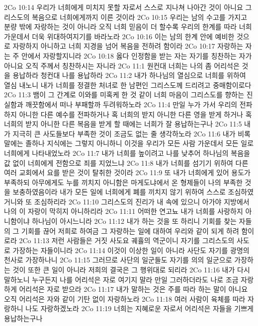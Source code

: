 2Co 10:14  우리가 너희에게 미치지 못할 자로서 스스로 지나쳐 나아간 것이 아니요 그리스도의 복음으로 너희에게까지 이른 것이라
2Co 10:15  우리는 남의 수고를 가지고 분량 밖에 자랑하는 것이 아니라 오직 너희 믿음이 더 할수록 우리의 한계를 따라 너희 가운데서 더욱 위대하여지기를 바라노라
2Co 10:16  이는 남의 한계 안에 예비한 것으로 자랑하지 아니하고 너희 지경을 넘어 복음을 전하려 함이라
2Co 10:17  자랑하는 자는 주 안에서 자랑할지니라
2Co 10:18  옳다 인정함을 받는 자는 자기를 칭찬하는 자가 아니요 오직 주께서 칭찬하시는 자니라
2Co 11:1  원컨대 너희는 나의 좀 어리석은 것을 용납하라 청컨대 나를 용납하라
2Co 11:2  내가 하나님의 열심으로 너희를 위하여 열심 내노니 내가 너희를 정결한 처녀로 한 남편인 그리스도께 드리려고 중매함이로다
2Co 11:3  뱀이 그 간계로 이와를 미혹케 한 것 같이 너희 마음이 그리스도를 향하는 진실함과 깨끗함에서 떠나 부패할까 두려워하노라
2Co 11:4  만일 누가 가서 우리의 전파하지 아니한 다른 예수를 전파하거나 혹 너희의 받지 아니한 다른 영을 받게 하거나 혹 너희의 받지 아니한 다른 복음을 받게 할 때에는 너희가 잘 용납하는구나
2Co 11:5  내가 지극히 큰 사도들보다 부족한 것이 조금도 없는 줄 생각하노라
2Co 11:6  내가 비록 말에는 졸하나 지식에는 그렇지 아니하니 이것을 우리가 모든 사람 가운데서 모든 일로 너희에게 나타내었노라
2Co 11:7  내가 너희를 높이려고 나를 낮추어 하나님의 복음을 값 없이 너희에게 전함으로 죄를 지었느냐
2Co 11:8  내가 너희를 섬기기 위하여 다른 여러 교회에서 요를 받은 것이 탈취한 것이라
2Co 11:9  또 내가 너희에게 있어 용도가 부족하되 아무에게도 누를 끼치지 아니함은 마게도냐에서 온 형제들이 나의 부족한 것을 보충하였음이라 내가 모든 일에 너희에게 폐를 끼치지 않기 위하여 스스로 조심하였거니와 또 조심하리라
2Co 11:10  그리스도의 진리가 내 속에 있으니 아가야 지방에서 나의 이 자랑이 막히지 아니하리라
2Co 11:11  어떠한 연고뇨 내가 너희를 사랑하지 아니함이냐 하나님이 아시느니라
2Co 11:12  내가 하는 것을 또 하리니 기회를 찾는 자들의 그 기회를 끊어 저희로 하여금 그 자랑하는 일에 대하여 우리와 같이 되게 하려 함이로라
2Co 11:13  저런 사람들은 거짓 사도요 궤휼의 역군이니 자기를 그리스도의 사도로 가장하는 자들이니라
2Co 11:14  이것이 이상한 일이 아니라 사단도 자기를 광명의 천사로 가장하나니
2Co 11:15  그러므로 사단의 일군들도 자기를 의의 일군으로 가장하는 것이 또한 큰 일이 아니라 저희의 결국은 그 행위대로 되리라
2Co 11:16  내가 다시 말하노니 누구든지 나를 어리석은 자로 여기지 말라 만일 그러하더라도 나로 조금 자랑하게 어리석은 자로 받으라
2Co 11:17  내가 말하는 것은 주를 따라 하는 말이 아니요 오직 어리석은 자와 같이 기탄 없이 자랑하노라
2Co 11:18  여러 사람이 육체를 따라 자랑하니 나도 자랑하겠노라
2Co 11:19  너희는 지혜로운 자로서 어리석은 자들을 기쁘게 용납하는구나
